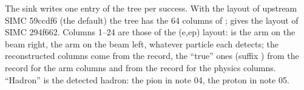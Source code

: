 The sink  writes one entry of the tree  per success. With the layout of upstream SIMC 59ccdf6
(the default) the tree has the 64 columns of ;  gives the layout of SIMC
294f662. Columns 1--24 are those of the (e,e\pr p) layout:  is the arm on the beam right,  the arm on
the beam left, whatever particle each detects; the reconstructed columns come from the  record, the
``true'' ones (suffix ) from the  record for the arm columns and from the  record
for the physics columns. ``Hadron'' is the detected hadron: the pion in note 04, the proton in note 05.

